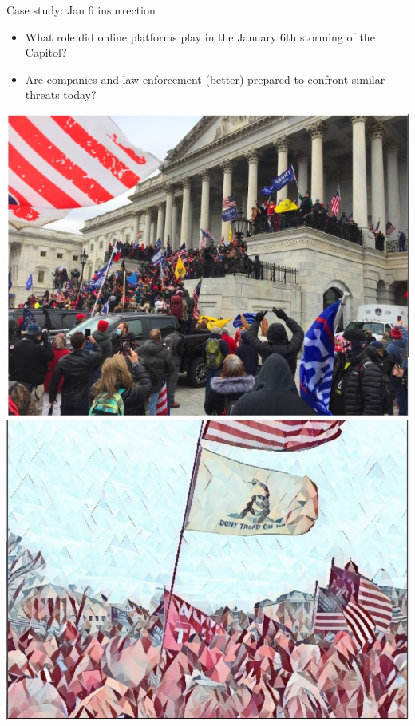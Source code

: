 \documentclass[nobackground,dvipsnames,table]{beamer}
\begin{document}
\begin{frame}{Case study: Jan 6 insurrection}
\begin{itemize}
    \item What role did online platforms play in the January 6th storming of the Capitol?
    \item Are companies and law enforcement (better) prepared to confront similar threats today?
\end{itemize}

\includegraphics[width=.49\textwidth]{img/fig6.jpg}
\includegraphics[width=.49\textwidth]{img/fig5.jpg}

\end{frame}
\end{document}
